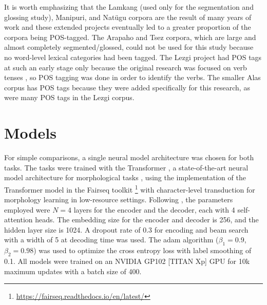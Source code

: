 It is worth emphasizing that the Lamkang (used only for the segmentation and glossing study), Manipuri, and Nat\"ugu corpora are the result of many years of work and these extended projects eventually led to a greater proportion of the corpora being POS-tagged. The Arapaho and Tsez corpora, which are large and almost completely segmented/glossed, could not be used for this study because no word-level lexical categories had been tagged. The Lezgi project had POS tags at such an early stage only because the original research was focused on verb tenses \citep{donet_importance_2014}, so POS tagging was done in order to identify the verbs. The smaller Alas corpus has POS tags because they were added specifically for this research, as were many POS tags in the Lezgi corpus.




\section{Models}

For simple comparisons, a single neural model architecture was chosen for both tasks. The tasks were trained with the Transformer \citep{vaswani_attention_2017}, a state-of-the-art neural model architecture for morphological tasks \citep{vylomova-etal-2020-sigmorphon}, using the implementation of the Transformer model in the Fairseq toolkit \cite{ott_fairseq_2019}\footnote{\url{https://fairseq.readthedocs.io/en/latest/}} with character-level transduction \citep{wu_applying_2020} for morphology learning in low-resource settings. Following \citep{wu_applying_2020}, the parameters employed were $N=4$ layers for the encoder and the decoder, each with 4 self-attention heads. The embedding size for the encoder and decoder is 256, and the hidden layer size is 1024. A dropout rate of 0.3 for encoding and beam search with a width of 5 at decoding time was used. The adam algorithm \citep{kingma2014adam} ($\beta_1 = 0.9$, $\beta_2 = 0.98$) was used to optimize the cross entropy loss with label smoothing \citep{szegedy2016rethinking} of 0.1. All models were trained on an NVIDIA GP102 [TITAN Xp] GPU for 10k maximum updates with a batch size of 400.

